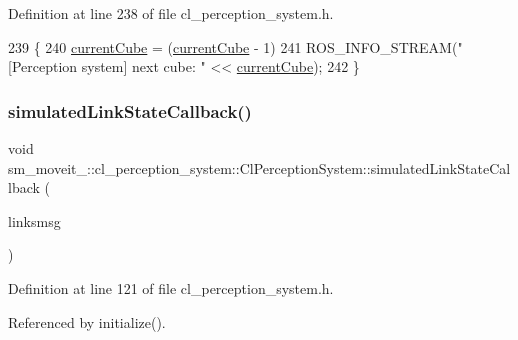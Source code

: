 Definition at line 238 of file cl\+\_\+perception\+\_\+system.\+h.


\begin{DoxyCode}
239             \{
240                 \hyperlink{classsm__moveit__4_1_1cl__perception__system_1_1ClPerceptionSystem_ae2a80b803814af8b3c87f810f2728af0}{currentCube} = (\hyperlink{classsm__moveit__4_1_1cl__perception__system_1_1ClPerceptionSystem_ae2a80b803814af8b3c87f810f2728af0}{currentCube} - 1) %
241                 ROS\_INFO\_STREAM(\textcolor{stringliteral}{"[Perception system] next cube: "} << \hyperlink{classsm__moveit__4_1_1cl__perception__system_1_1ClPerceptionSystem_ae2a80b803814af8b3c87f810f2728af0}{currentCube});
242             \}
\end{DoxyCode}
\mbox{\label{classsm__moveit__4_1_1cl__perception__system_1_1ClPerceptionSystem_a345284941e550bc24c90001351a25087}} 
\subsubsection{\texorpdfstring{simulated\+Link\+State\+Callback()}{simulatedLinkStateCallback()}}
{\footnotesize\ttfamily void sm\+\_\+moveit\+\_\+::cl\+\_\+perception\+\_\+system\+::\+Cl\+Perception\+System\+::simulated\+Link\+State\+Callback (\begin{DoxyParamCaption}\item[{const gazebo\+\_\+msgs\+::\+Link\+States \&}]{linksmsg }\end{DoxyParamCaption})\hspace{0.3cm}{\ttfamily [inline]}}



Definition at line 121 of file cl\+\_\+perception\+\_\+system.\+h.



Referenced by initialize().


